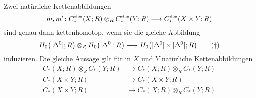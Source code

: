 \begin{proposition}[name={Eindeutigkeit},label=prop:16:eind]
	Zwei natürliche Kettenabbildungen 
	\[
		m,m' \colon C^\sing_* (X;R) \otimes_R C^\sing_* \enbrace*{Y;R} \longrightarrow C_*^\sing \enbrace*{X \times Y;R}
	\]
	sind genau dann kettenhomotop, wenn sie die gleiche Abbildung
	\begin{equation}
		H_0 \enbrace*{\abs{\Delta^0};R } \otimes_R H_0 \enbrace*{\abs{\Delta^0};R} \longrightarrow H_0 \enbrace*{\abs{\Delta^0} \times \abs{\Delta^0};R} \label{eq:16:H0}\tag{\dag}
	\end{equation} 
	induzieren.
	Die gleiche Aussage gilt für in $X$ und $Y$ natürliche Kettenabbildungen 
	\begin{align}
		C_*(X;R) \otimes_R C_*(Y;R) &\longrightarrow  C_*(X;R) \otimes_R C_*(Y;R) \\
		C_*(X \times Y;R) &\longrightarrow C_* (X \times Y;R) \\
		C_*(X \times Y;R) &\longrightarrow C_*(X;R) \otimes_R C_*(Y;R)
	\end{align}
\end{proposition}
